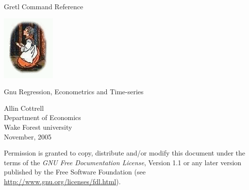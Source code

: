 \documentclass[oneside]{book}
\begin{document}
\VerbatimFootnotes

\setlength{\parindent}{0pt}
\setlength{\parskip}{1ex}

\newcommand{\gtitle}[1]{\vspace*{1in}
   {\Huge \sffamily #1}\par
   \vspace{.5in}
  \includegraphics{figures/gretl-logo} 
}

\newcommand{\gsubtitle}[1]{%
   {\Large \sffamily #1}
   \vspace{.5in}
}


\thispagestyle{empty}

\begin{center}
\label{titlepage}

\gtitle{Gretl Command Reference}

\gsubtitle{Gnu Regression, Econometrics and Time-series}

{\large \sffamily 
Allin Cottrell\\
Department of Economics\\
Wake Forest university\\
\vspace{20pt}
November, 2005}

\end{center}
\clearpage



\thispagestyle{empty}

\label{license}

\vspace*{2in}

Permission is granted to copy, distribute and/or modify this document
under the terms of the \emph{GNU Free Documentation License}, Version
1.1 or any later version published by the Free Software Foundation
(see \url{http://www.gnu.org/licenses/fdl.html}).

\clearpage


\pagestyle{headings}

\tableofcontents

\clearpage
{}


\end{document}
